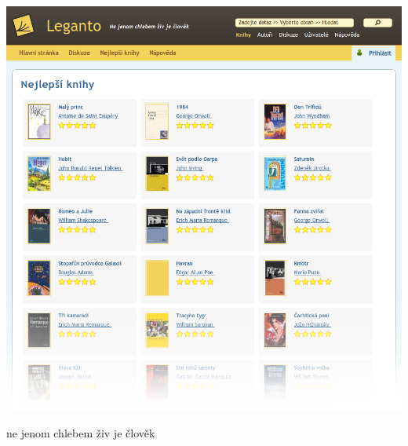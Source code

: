 \documentclass[a3]{a0poster}
\begin{document}
~

\bigskip
\bigskip
\bigskip


\hrulefill

\medskip

\begin{minipage}{0.34\textwidth}
\includegraphics[width=\textwidth]{screenshot-part.png}
\end{minipage}
\begin{minipage}{0.64\textwidth}
\end{minipage}

\medskip

\hrulefill

\medskip

{\Large \textsf{ne jenom chlebem živ je člověk}}
\end{document}
